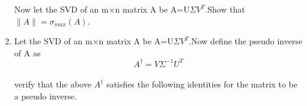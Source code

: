 \documentclass[journal,12pt,twocolumn]{IEEEtran}
\begin{document}
\begin{enumerate}
Now let the SVD of an m$\times$n matrix A be A=U$\Sigma{V^T}.$Show that $\|A\|=\sigma_{max}(A)$.
\item Let the SVD of an m$\times$n matrix A be A=U$\Sigma{V^T}.$Now define the pseudo inverse of A as
$$A^\dagger=V\Sigma^{-1}U^{T}$$\\
verify that the above $A^\dagger$ satisfies the following identities for the matrix to be a pseudo inverse.
\begin{enumerate}[(i)]
\end{enumerate}
\end{enumerate}
\end{document}
